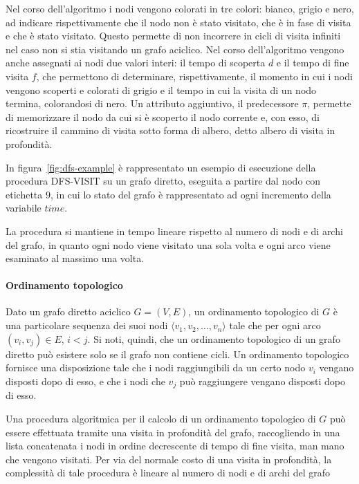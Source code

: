 Nel corso dell'algoritmo i nodi vengono colorati in tre colori: bianco, grigio e nero, ad indicare rispettivamente
che il nodo non \`e stato visitato, che \`e in fase di visita e che \`e stato visitato.
Questo permette di non incorrere in cicli di visita infiniti nel caso non si stia visitando un grafo aciclico.
Nel corso dell'algoritmo vengono anche assegnati ai nodi due valori interi: il tempo di scoperta $d$ e il tempo di
fine visita $f$, che permettono di determinare, rispettivamente, il momento in cui i nodi vengono scoperti e colorati
di grigio e il tempo in cui la visita di un nodo termina, colorandosi di nero.
Un attributo aggiuntivo, il predecessore $\pi$, permette di memorizzare il nodo da cui si \`e scoperto il nodo
corrente e, con esso, di ricostruire il cammino di visita sotto forma di albero, detto albero di visita in profondit\`a.
\newline

In figura~\ref{fig:dfs-example} \`e rappresentato un esempio di esecuzione della procedura DFS-VISIT su un grafo
diretto, eseguita a partire dal nodo con etichetta $9$, in cui lo stato del grafo \`e rappresentato ad ogni
incremento della variabile $time$. \newline

La procedura si mantiene in tempo lineare rispetto al numero di nodi e di archi del grafo, in quanto
ogni nodo viene visitato una sola volta e ogni arco viene esaminato al massimo una volta.

\paragraph{Ordinamento topologico}
Dato un grafo diretto aciclico $G = (V, E)$, un ordinamento topologico di $G$ \`e una particolare sequenza
dei suoi nodi $\langle v_1, v_2, \ldots, v_n \rangle$ tale che per ogni arco $(v_i, v_j) \in E$, $i < j$.
Si noti, quindi, che un ordinamento topologico di un grafo diretto pu\`o esistere solo se il grafo non contiene
cicli.
Un ordinamento topologico fornisce una disposizione tale che i nodi raggiungibili da un certo nodo $v_i$ vengano
disposti dopo di esso, e che i nodi che $v_j$ pu\`o raggiungere vengano disposti dopo di esso.

Una procedura algoritmica per il calcolo di un ordinamento topologico di $G$ pu\`o essere effettuata tramite una
visita in profondit\`a del grafo, raccogliendo in una lista concatenata i nodi in ordine decrescente di tempo
di fine visita, man mano che vengono visitati.
Per via del normale costo di una visita in profondit\`a, la complessit\`a di tale procedura \`e lineare al
numero di nodi e di archi del grafo \newline


